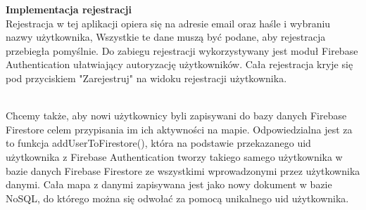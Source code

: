 \noindent
\textbf{Implementacja rejestracji}\\
\indent Rejestracja w tej aplikacji opiera się na adresie email oraz haśle i wybraniu nazwy użytkownika, Wszystkie te dane muszą być podane, aby rejestracja przebiegła pomyślnie. Do zabiegu rejestracji wykorzystywany jest moduł Firebase Authentication ułatwiający autoryzację użytkowników. Cała rejestracja kryje się pod przyciskiem "Zarejestruj" na widoku rejestracji użytkownika.\\
\noindent
\setlength{\fboxrule}{0.5pt}
\begin{minipage}{\linewidth}
    \label{lst:register}
    \centering
\end{minipage}
\\

Chcemy także, aby nowi użytkownicy byli zapisywani do bazy danych Firebase Firestore celem przypisania im ich aktywności na mapie. Odpowiedzialna jest za to funkcja addUserToFirestore(), która na podstawie przekazanego uid użytkownika z Firebase Authentication tworzy takiego samego użytkownika w bazie danych Firebase Firestore ze wszystkimi wprowadzonymi przez użytkownika danymi. Cała mapa z danymi zapisywana jest jako nowy dokument w bazie NoSQL, do którego można się odwołać za pomocą unikalnego uid użytkownika.\\
\noindent
\setlength{\fboxrule}{0.5pt}
\begin{minipage}{\linewidth}
    \label{lst:addtofirestore}
    \centering
\end{minipage}

